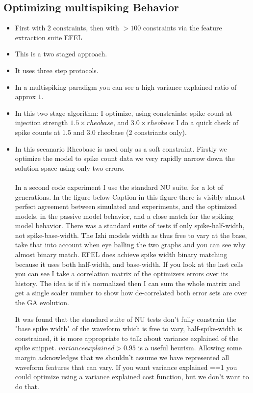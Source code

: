 \documentclass{article}
\begin{document}
\subsection{Optimizing multispiking Behavior}
\begin{itemize}
\item First with $2$ constraints, then with $>100$ constraints via the feature extraction suite EFEL

\item This is a two staged approach. 
\item It uses three step protocols.

\item In a multispiking paradigm you can see a high variance explained ratio of approx $1$.  

\item In this two stage algorithm: I optimize, using constraints: spike count at injection strength $1.5 \times rheobase $, and $3.0 \times rheobase $
I do a quick check of spike counts at 1.5 and 3.0 rheobase (2 constriants only).

\item In this sceanario Rheobase is used only as a soft constraint. Firstly we optimize the model to spike count data we very rapidly narrow down the solution space using only two errors. \\
\\
In a second code experiment I use the standard NU suite, for a lot of generations. In the figure below
Caption in this figure there is visibly almost perfect agreement between simulated and experiments, and the optimized models, in the passive model behavior, and a close match for the spiking model behavior. There was a standard suite of tests if only spike-half-width, not spike-base-width. The Izhi models width as thus free to vary at the base, take that into account when eye balling the two graphs and you can see why almost binary match. EFEL does achieve spike width binary matching because it uses both half-width, and base-width. If you look at the last cells you can see I take a correlation matrix of the optimizers errors over its history. The idea is if it's normalized then I can sum the whole matrix and get a single scaler number to show how de-correlated both error sets are over the GA evolution. 

It was found that the standard suite of NU tests don't fully constrain the "base spike width" of the waveform which is free to vary, half-spike-width is constrained, it is more appropriate to talk about variance explained of the spike snippet. $variance explained>0.95$ is a useful heurism. Allowing some margin acknowledges that we shouldn't assume we have represented all waveform features that can vary. If you want variance explained ==1   you could optimize using a variance explained cost function, but we don't want to do that. 
\end{itemize}







\end{document}
